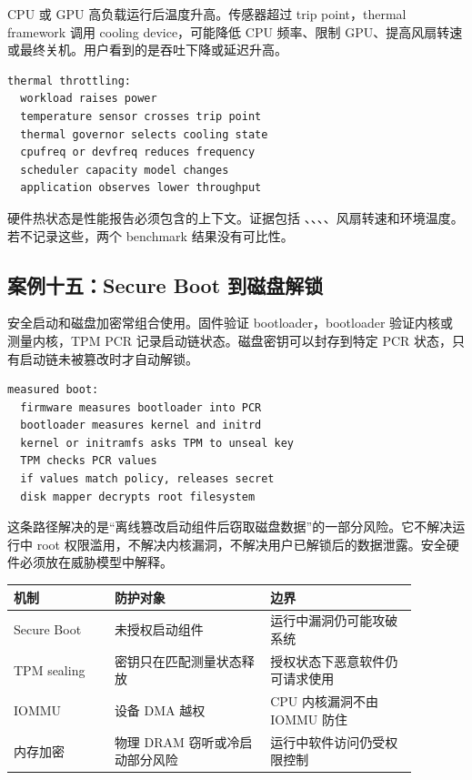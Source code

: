 CPU 或 GPU 高负载运行后温度升高。传感器超过 trip point，thermal framework 调用 cooling device，可能降低 CPU 频率、限制 GPU、提高风扇转速或最终关机。用户看到的是吞吐下降或延迟升高。

\begin{lstlisting}
thermal throttling:
  workload raises power
  temperature sensor crosses trip point
  thermal governor selects cooling state
  cpufreq or devfreq reduces frequency
  scheduler capacity model changes
  application observes lower throughput
\end{lstlisting}

硬件热状态是性能报告必须包含的上下文。证据包括 、、、、风扇转速和环境温度。若不记录这些，两个 benchmark 结果没有可比性。

\subsection{案例十五：Secure Boot 到磁盘解锁}

安全启动和磁盘加密常组合使用。固件验证 bootloader，bootloader 验证内核或测量内核，TPM PCR 记录启动链状态。磁盘密钥可以封存到特定 PCR 状态，只有启动链未被篡改时才自动解锁。

\begin{lstlisting}
measured boot:
  firmware measures bootloader into PCR
  bootloader measures kernel and initrd
  kernel or initramfs asks TPM to unseal key
  TPM checks PCR values
  if values match policy, releases secret
  disk mapper decrypts root filesystem
\end{lstlisting}

这条路径解决的是“离线篡改启动组件后窃取磁盘数据”的一部分风险。它不解决运行中 root 权限滥用，不解决内核漏洞，不解决用户已解锁后的数据泄露。安全硬件必须放在威胁模型中解释。

\begin{longtable}{p{0.22\linewidth}p{0.34\linewidth}p{0.32\linewidth}}
\toprule
机制 & 防护对象 & 边界 \\
\midrule
Secure Boot & 未授权启动组件 & 运行中漏洞仍可能攻破系统 \\
TPM sealing & 密钥只在匹配测量状态释放 & 授权状态下恶意软件仍可请求使用 \\
IOMMU & 设备 DMA 越权 & CPU 内核漏洞不由 IOMMU 防住 \\
内存加密 & 物理 DRAM 窃听或冷启动部分风险 & 运行中软件访问仍受权限控制 \\
\bottomrule
\end{longtable}

